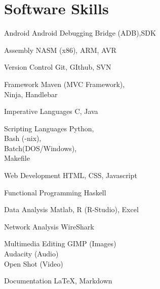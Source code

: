 \documentclass{tccv}
\begin{document}
\section{Software Skills}
	\begin{factlist}
		\item {Android}
			{Android Debugging Bridge (ADB),SDK}
		\item {Assembly}
			{NASM (x86), ARM, AVR}
		\item {Version Control}
			{Git, GIthub, SVN}
		\item{Framework}
			{Maven (MVC Framework), \\
			 Ninja, Handlebar}
		\item{Imperative Languages}
			{C, Java}
		\item{Scripting Languages}
			{Python,\\
			 Bash (-nix),\\
			 Batch(DOS/Windows), \\
			 Makefile}
		\item{Web Development}
			{HTML, CSS, Javascript}
		\item{Functional Programming}
			{Haskell}
		\item{Data Analysis}
			{Matlab, R (R-Studio), Excel}
		\item{Network Analysis}
			{WireShark}
		\item{Multimedia Editing}
			{GIMP (Images) \\
			Audacity (Audio)\\
			Open Shot (Video)} 
		\item{Documentation}
			{\LaTeX, Markdown}
	\end{factlist}


\end{document}
